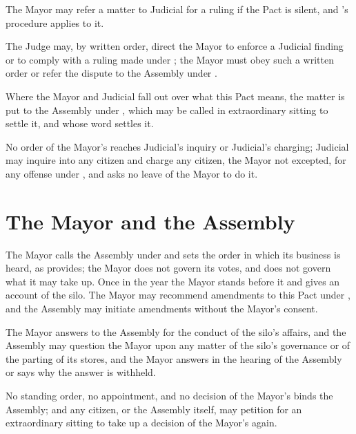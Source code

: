\begin{clauses}
\item The Mayor may refer a matter to Judicial for a ruling if the Pact is silent, and 's procedure applies to it.
\item The Judge may, by written order, direct the Mayor to enforce a Judicial finding or to comply with a ruling made under ; the Mayor must obey such a written order or refer the dispute to the Assembly under .
\item Where the Mayor and Judicial fall out over what this Pact means, the matter is put to the Assembly under , which may be called in extraordinary sitting to settle it, and whose word settles it.
\item No order of the Mayor's reaches Judicial's inquiry or Judicial's charging; Judicial may inquire into any citizen and charge any citizen, the Mayor not excepted, for any offense under , and asks no leave of the Mayor to do it.
\end{clauses}

\section{The Mayor and the Assembly}
\label{sec:mayor:mayor-and-the-assembly}

The Mayor calls the Assembly under  and sets the order in which its business is heard, as  provides; the Mayor does not govern its votes, and does not govern what it may take up. Once in the year the Mayor stands before it and gives an account of the silo. The Mayor may recommend amendments to this Pact under , and the Assembly may initiate amendments without the Mayor's consent.

\begin{clauses}
\item The Mayor answers to the Assembly for the conduct of the silo's affairs, and the Assembly may question the Mayor upon any matter of the silo's governance or of the parting of its stores, and the Mayor answers in the hearing of the Assembly or says why the answer is withheld.
\item No standing order, no appointment, and no decision of the Mayor's binds the Assembly; and any citizen, or the Assembly itself, may petition for an extraordinary sitting to take up a decision of the Mayor's again.
\end{clauses}

